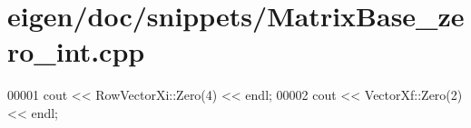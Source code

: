 \hypertarget{eigen_2doc_2snippets_2_matrix_base__zero__int_8cpp_source}{}\section{eigen/doc/snippets/\+Matrix\+Base\+\_\+zero\+\_\+int.cpp}
\label{eigen_2doc_2snippets_2_matrix_base__zero__int_8cpp_source}

\begin{DoxyCode}
00001 cout << RowVectorXi::Zero(4) << endl;
00002 cout << VectorXf::Zero(2) << endl;
\end{DoxyCode}
